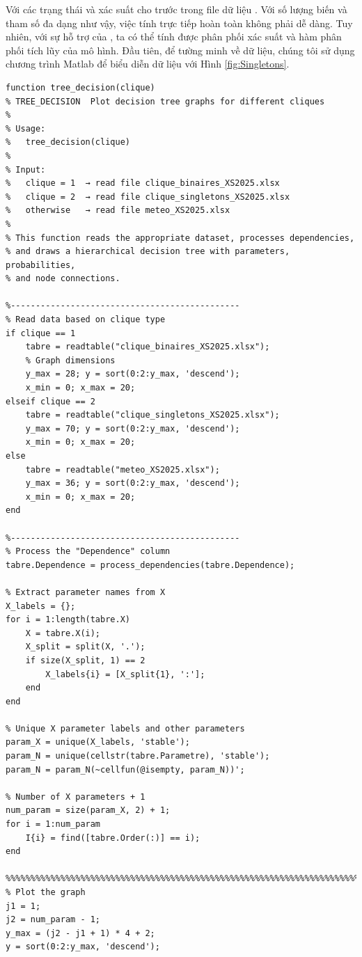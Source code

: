 Với các trạng thái và xác suất cho trước trong file dữ liệu . Với số lượng biến và tham số đa dạng như vậy, việc tính trực tiếp hoàn toàn không phải dễ dàng. Tuy nhiên, với sự hỗ trợ của , ta có thể tính được phân phối xác suất và hàm phân phối tích lũy của mô hình. Đầu tiên, để tường minh về dữ liệu, chúng tôi sử dụng chương trình Matlab để biểu diễn dữ liệu với Hình \ref{fig:Singletons}.

\begin{matlab}
\begin{lstlisting}[caption={Hàm vẽ sơ đồ mô hình Singletons}]
function tree_decision(clique)
% TREE_DECISION  Plot decision tree graphs for different cliques
%
% Usage:
%   tree_decision(clique)
%
% Input:
%   clique = 1  → read file clique_binaires_XS2025.xlsx
%   clique = 2  → read file clique_singletons_XS2025.xlsx
%   otherwise   → read file meteo_XS2025.xlsx
%
% This function reads the appropriate dataset, processes dependencies,
% and draws a hierarchical decision tree with parameters, probabilities,
% and node connections.

%----------------------------------------------
% Read data based on clique type
if clique == 1
    tabre = readtable("clique_binaires_XS2025.xlsx");
    % Graph dimensions
    y_max = 28; y = sort(0:2:y_max, 'descend');
    x_min = 0; x_max = 20; 
elseif clique == 2
    tabre = readtable("clique_singletons_XS2025.xlsx");
    y_max = 70; y = sort(0:2:y_max, 'descend');
    x_min = 0; x_max = 20; 
else
    tabre = readtable("meteo_XS2025.xlsx");
    y_max = 36; y = sort(0:2:y_max, 'descend');
    x_min = 0; x_max = 20; 
end

%----------------------------------------------
% Process the "Dependence" column
tabre.Dependence = process_dependencies(tabre.Dependence);

% Extract parameter names from X
X_labels = {};
for i = 1:length(tabre.X)
    X = tabre.X(i);
    X_split = split(X, '.');
    if size(X_split, 1) == 2
        X_labels{i} = [X_split{1}, ':'];
    end
end

% Unique X parameter labels and other parameters
param_X = unique(X_labels, 'stable');
param_N = unique(cellstr(tabre.Parametre), 'stable');
param_N = param_N(~cellfun(@isempty, param_N))';

% Number of X parameters + 1
num_param = size(param_X, 2) + 1;
for i = 1:num_param
    I{i} = find([tabre.Order(:)] == i);
end

%%%%%%%%%%%%%%%%%%%%%%%%%%%%%%%%%%%%%%%%%%%%%%%%%%%%%%%%%%%%%%%%%%%%%%%%%%%
% Plot the graph
j1 = 1;
j2 = num_param - 1;
y_max = (j2 - j1 + 1) * 4 + 2;
y = sort(0:2:y_max, 'descend');


\end{lstlisting}
\end{matlab}
